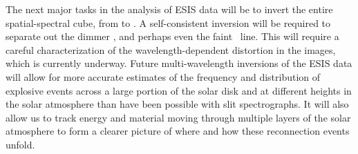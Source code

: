 	The next major tasks in the analysis of ESIS data will be to invert the entire spatial-spectral cube, from  to . 
	A self-consistent inversion will be required to separate out the dimmer \mgxdim, and perhaps even the faint \oiii \ line. This will require a careful characterization of the wavelength-dependent distortion in the images, which is currently underway.
	Future multi-wavelength inversions of the ESIS data will allow for more accurate estimates of the frequency and distribution of explosive events across a large portion of the solar disk and at different heights in the solar atmosphere than have been possible with slit spectrographs.
	It will also allow us to track energy and material moving through multiple layers of the solar atmosphere to form a clearer picture of where and how these reconnection events unfold. 
	




\appendix
